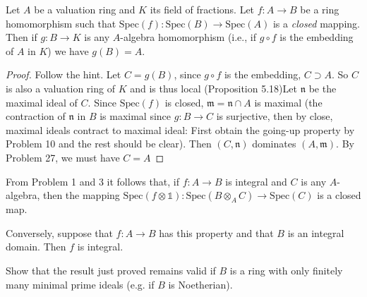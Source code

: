 \documentclass{solution}
\begin{document}
\begin{problem}
    Let $A$ be a valuation ring and $K$ its field of fractions. Let $f: A \rightarrow B$ be a ring homomorphism such that $\mathrm{Spec}(f): \mathrm{Spec}(B) \rightarrow \mathrm{Spec}(A)$ is a \textit{closed} mapping. Then if $g: B \rightarrow K$ is any $A$-algebra homomorphism (i.e., if $g \circ f$ is the embedding of $A$ in $K$) we have $g(B) = A$.
\end{problem}

\begin{proof}
    Follow the hint. Let $C = g(B)$, since $g \circ f$ is the embedding, $C \supset A$. So $C$ is also a valuation ring of $K$ and is thus local (Proposition 5.18)Let $\mathfrak{n}$ be the maximal ideal of $C$. Since $\mathrm{Spec}(f)$ is closed, $\mathfrak{m} = \mathfrak{n} \cap A$ is maximal (the contraction of $\mathfrak{n}$ in $B$ is maximal since $g: B \rightarrow C$ is surjective, then by close, maximal ideals contract to maximal ideal: First obtain the going-up property by Problem 10 and the rest should be clear). Then $(C, \mathfrak{n})$ dominates $(A, \mathfrak{m})$. By Problem 27, we must have $C = A$
\end{proof}

\begin{problem}
    From Problem 1 and 3 it follows that, if $f: A \rightarrow B$ is integral and $C$ is any $A$-algebra, then the mapping $\mathrm{Spec}(f \otimes \mathds{1}): \mathrm{Spec}(B \otimes_A C) \rightarrow \mathrm{Spec}(C)$ is a closed map.

    Conversely, suppose that $f: A \rightarrow B$ has this property and that $B$ is an integral domain. Then $f$ is integral.

    Show that the result just proved remains valid if $B$ is a ring with only finitely many minimal prime ideals (e.g. if $B$ is Noetherian). 
\end{problem}
\end{document}
